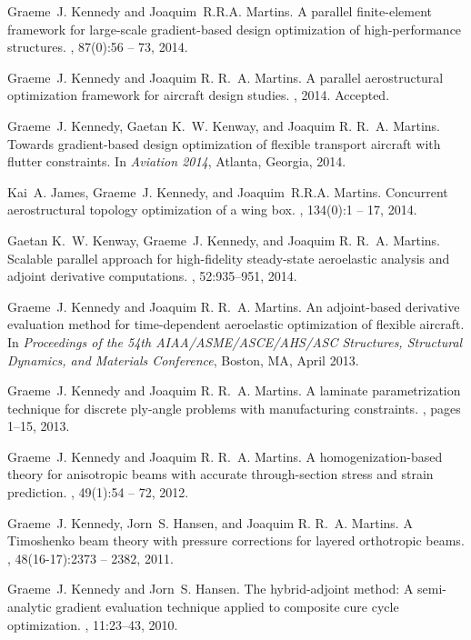 \documentclass[12pt,headinclude,headsepline]{article}
\begin{document}
\begin{thebibliography}{1}

Graeme~J. Kennedy and Joaquim~R.R.A. Martins.
\newblock A parallel finite-element framework for large-scale gradient-based
  design optimization of high-performance structures.
, 87(0):56 -- 73, 2014.

Graeme~J. Kennedy and Joaquim R. R.~A. Martins.
\newblock A parallel aerostructural optimization framework for aircraft design
  studies.
, 2014.
\newblock Accepted.

Graeme~J. Kennedy, Gaetan K.~W. Kenway, and Joaquim R. R.~A. Martins.
\newblock Towards gradient-based design optimization of flexible transport
  aircraft with flutter constraints.
\newblock In {\em Aviation 2014}, Atlanta, Georgia, 2014.

Kai~A. James, Graeme~J. Kennedy, and Joaquim~R.R.A. Martins.
\newblock Concurrent aerostructural topology optimization of a wing box.
, 134(0):1 -- 17, 2014.

Gaetan K.~W. Kenway, Graeme~J. Kennedy, and Joaquim R. R.~A. Martins.
\newblock Scalable parallel approach for high-fidelity steady-state aeroelastic
  analysis and adjoint derivative computations.
, 52:935--951, 2014.

Graeme~J. Kennedy and Joaquim R. R.~A. Martins.
\newblock An adjoint-based derivative evaluation method for time-dependent
  aeroelastic optimization of flexible aircraft.
\newblock In {\em Proceedings of the 54th AIAA/ASME/ASCE/AHS/ASC Structures,
  Structural Dynamics, and Materials Conference}, Boston, {MA}, April 2013.

Graeme~J. Kennedy and Joaquim R. R.~A. Martins.
\newblock A laminate parametrization technique for discrete ply-angle problems
  with manufacturing constraints.
, pages 1--15,
  2013.

Graeme~J. Kennedy and Joaquim R. R.~A. Martins.
\newblock A homogenization-based theory for anisotropic beams with accurate
  through-section stress and strain prediction.
, 49(1):54 -- 72,
  2012.

Graeme~J. Kennedy, Jorn~S. Hansen, and Joaquim R. R.~A. Martins.
\newblock A {T}imoshenko beam theory with pressure corrections for layered
  orthotropic beams.
, 48(16-17):2373
  -- 2382, 2011.

Graeme~J. Kennedy and Jorn~S. Hansen.
\newblock The hybrid-adjoint method: {A} semi-analytic gradient evaluation
  technique applied to composite cure cycle optimization.
, 11:23--43, 2010.

\end{thebibliography}
\end{document}
